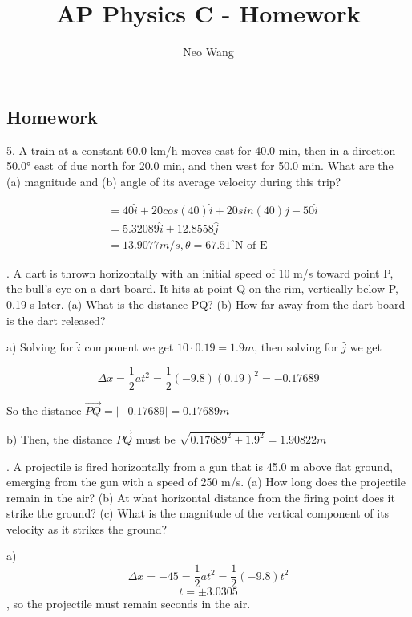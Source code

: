 \documentclass{scrreprt} %
\title{AP Physics C - Homework}
\author{Neo Wang}
\begin{document}
\subsection{Homework}

5. A train at a constant 60.0 km/h moves east for 40.0 min,
then  in  a  direction  50.0° east  of  due  north  for  20.0 min, and  then
west for 50.0 min. What are the (a) magnitude and (b) angle of its
average velocity during this trip?

\begin{align*}
	&= 40\hat{i} + 20cos(40)\hat{i} + 20sin(40)\hat{j} - 50 \hat{i} \\
	&= 5.32089\hat{i} + 12.8558\hat{j} \\
	&= \boxed{13.9077 m/s, \theta = 67.51^\circ \textrm{N of E}}
\end{align*}


. A dart is thrown horizontally with an initial speed of 
10 m/s  toward  point  P, the  bull’s-eye  on  a  dart  board. It  hits  at
point Q on the rim, vertically below P, 0.19 s later. (a) What is the
distance PQ?  (b)  How  far  away  from  the  dart  board  is  the  dart
released? \newline

a) Solving for $\hat{i}$ component we get $10\cdot 0.19 = 1.9 m$, then solving
for $\hat{j}$ we get

$$\Delta x = \frac{1}{2}at^2 = \frac{1}{2}(-9.8)(0.19)^2=-0.17689$$

So the distance $\vec{PQ} = |-0.17689| = \boxed{0.17689 m}$

b) Then, the distance $\vec{PQ}$ must be $\sqrt{0.17689^2 + 1.9^2} = \boxed{1.90822 m}$\newline

. A projectile is fired horizontally from a gun that is 
45.0 m above flat ground, emerging from the gun with a speed of
250 m/s. (a) How long does the projectile remain in the air? (b) At
what  horizontal  distance  from  the  firing  point  does  it  strike  the
ground? (c) What is the magnitude of the vertical component of its
velocity as it strikes the ground? \newline

a) $$\Delta x = -45 = \frac{1}{2}at^2 = \frac{1}{2}(-9.8)t^2$$
$$t = \pm 3.0305$$, so the projectile must remain  seconds in the air.
\end{document}
